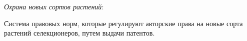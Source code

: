 \textit{Охрана новых сортов растений}:

Система правовых норм, которые регулируют авторские права на новые сорта растений селекционеров, путем выдачи патентов.\\
